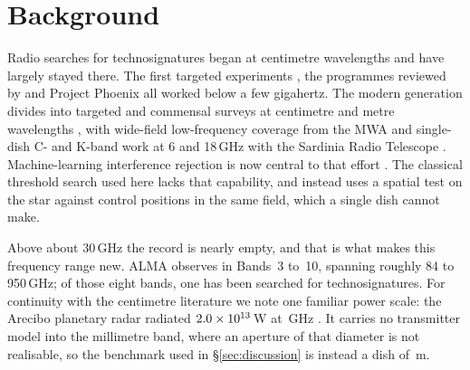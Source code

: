 \section{Background}
\label{sec:background}

Radio searches for technosignatures began at centimetre wavelengths and
have largely stayed there. The first targeted experiments
\citep{CocconiMorrison1959,Drake1960}, the programmes reviewed by
\citet{Tarter2001} and Project Phoenix \citep{Backus2002} all worked
below a few gigahertz. The modern generation divides into targeted and
commensal surveys at centimetre and metre wavelengths
\citep{Zhang2020,Czech2021,Morrison2023,FAST3IATLAS2025,LOFARdualsite2023},
with wide-field low-frequency coverage from the MWA \citep{Tremblay2024}
and single-dish C- and K-band work at 6 and 18\,GHz with the Sardinia
Radio Telescope \citep{SRT2025}. Machine-learning interference rejection
is now central to that effort
\citep{Ma2023,Choza2024,GLOBULAR2025,AnomalyParkesGBT2025,BRaTs2026}. The
classical threshold search used here lacks that capability, and instead
uses a spatial test on the star against control positions in the same
field, which a single dish cannot make.

Above about 30\,GHz the record is nearly empty, and that is what makes
this frequency range new. ALMA observes in Bands~3 to~10, spanning
roughly 84 to 950\,GHz; of those eight bands, one has been searched for
technosignatures. For continuity with the centimetre literature we note
one familiar power scale: the Arecibo planetary radar radiated
$2.0\times10^{13}$\,W at \ArecGHz\,GHz
\citep{Drake1974,EarthDetectingEarth2025}. It carries no transmitter
model into the millimetre band, where an aperture of that diameter is not
realisable, so the benchmark used in \S\ref{sec:discussion} is instead a
dish of \BenchDiam\,m.


